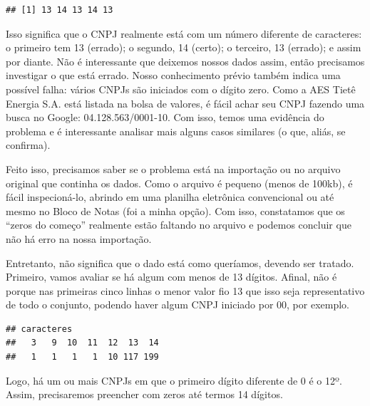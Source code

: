 \documentclass[
]{book}
\newenvironment{Shaded}{\begin{snugshade}}{\end{snugshade}}
\newcommand{\FunctionTok}[1]{\textcolor[rgb]{0.00,0.00,0.00}{#1}}
\newcommand{\NormalTok}[1]{#1}
\newcommand{\OtherTok}[1]{\textcolor[rgb]{0.56,0.35,0.01}{#1}}
\newcommand{\SpecialCharTok}[1]{\textcolor[rgb]{0.00,0.00,0.00}{#1}}
\begin{document}
\begin{verbatim}
## [1] 13 14 13 14 13
\end{verbatim}

Isso significa que o CNPJ realmente está com um número diferente de caracteres: o primeiro tem 13 (errado); o segundo, 14 (certo); o terceiro, 13 (errado); e assim por diante. Não é interessante que deixemos nossos dados assim, então precisamos investigar o que está errado. Nosso conhecimento prévio também indica uma possível falha: vários CNPJs são iniciados com o dígito zero. Como a AES Tietê Energia S.A. está listada na bolsa de valores, é fácil achar seu CNPJ fazendo uma busca no Google: 04.128.563/0001-10. Com isso, temos uma evidência do problema e é interessante analisar mais alguns casos similares (o que, aliás, se confirma).

Feito isso, precisamos saber se o problema está na importação ou no arquivo original que continha os dados. Como o arquivo é pequeno (menos de 100kb), é fácil inspecioná-lo, abrindo em uma planilha eletrônica convencional ou até mesmo no Bloco de Notas (foi a minha opção). Com isso, constatamos que os ``zeros do começo'' realmente estão faltando no arquivo e podemos concluir que não há erro na nossa importação.

Entretanto, não significa que o dado está como queríamos, devendo ser tratado. Primeiro, vamos avaliar se há algum com menos de 13 dígitos. Afinal, não é porque nas primeiras cinco linhas o menor valor fio 13 que isso seja representativo de todo o conjunto, podendo haver algum CNPJ iniciado por 00, por exemplo.

\begin{Shaded}
\end{Shaded}

\begin{verbatim}
## caracteres
##   3   9  10  11  12  13  14 
##   1   1   1   1  10 117 199
\end{verbatim}

Logo, há um ou mais CNPJs em que o primeiro dígito diferente de 0 é o 12º. Assim, precisaremos preencher com zeros até termos 14 dígitos.
\end{document}
